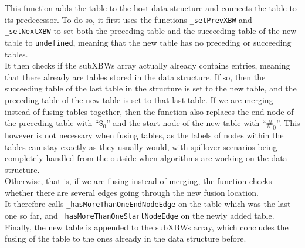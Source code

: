 \documentclass[a4paper,12pt,twoside,BCOR=10mm]{scrbook}
\begin{document}
This function adds the table to the host data structure and connects the table to its predecessor.
To do so, it first uses the functions \texttt{\_setPrevXBW} and \texttt{\_setNextXBW} to
set both the preceding table and the succeeding table
of the new table to \texttt{undefined}, meaning that the new table
has no preceding or succeeding tables. \\
It then checks if the subXBWs array actually already contains entries, meaning that there
already are tables stored in the data structure.
If so, then the succeeding table of the last table in the structure is set to the new table,
and the preceding table of the new table is set to that last table.
If we are merging instead of fusing tables together, then the function also
replaces the end node of the preceding table with “$\$_0$” and the start node
of the new table with “$\#_0$”.
This however is not necessary when fusing tables, as the labels of nodes within the
tables can stay exactly as they usually would, with spillover scenarios being
completely handled from the outside when algorithms are working on the data structure. \\
Otherwise, that is, if we are fusing instead of merging, the function checks
whether there are several edges going through the new fusion location. \\
It therefore calls \texttt{\_hasMoreThanOneEndNodeEdge} on the table which was the last one so far,
and \texttt{\_hasMoreThanOneStartNodeEdge} on the newly added table. \\
Finally, the new table is appended to the subXBWs array, which concludes the fusing of the
table to the ones already in the data structure before.
\end{document}
